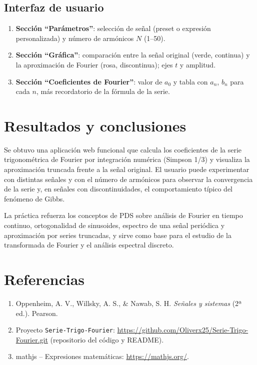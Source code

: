 \documentclass[12pt,a4paper]{article}
\begin{document}
\subsection{Interfaz de usuario}

\begin{enumerate}
  \item \textbf{Sección ``Parámetros''}: selección de señal (preset o expresión personalizada) y número de armónicos \(N\) (1--50).
  \item \textbf{Sección ``Gráfica''}: comparación entre la señal original (verde, continua) y la aproximación de Fourier (rosa, discontinua); ejes \(t\) y amplitud.
  \item \textbf{Sección ``Coeficientes de Fourier''}: valor de \(a_0\) y tabla con \(a_n\), \(b_n\) para cada \(n\), más recordatorio de la fórmula de la serie.
\end{enumerate}

\section{Resultados y conclusiones}

Se obtuvo una aplicación web funcional que calcula los coeficientes de la serie trigonométrica de Fourier por integración numérica (Simpson 1/3) y visualiza la aproximación truncada frente a la señal original. El usuario puede experimentar con distintas señales y con el número de armónicos para observar la convergencia de la serie y, en señales con discontinuidades, el comportamiento típico del fenómeno de Gibbs.

La práctica refuerza los conceptos de PDS sobre análisis de Fourier en tiempo continuo, ortogonalidad de sinusoides, espectro de una señal periódica y aproximación por series truncadas, y sirve como base para el estudio de la transformada de Fourier y el análisis espectral discreto.

\section*{Referencias}

\begin{enumerate}
  \item Oppenheim, A. V., Willsky, A. S., \& Nawab, S. H. \emph{Señales y sistemas} (2ª ed.). Pearson.
  \item Proyecto \texttt{Serie-Trigo-Fourier}: \url{https://github.com/Oliverx25/Serie-Trigo-Fourier.git} (repositorio del código y README).
  \item mathjs -- Expresiones matemáticas: \url{https://mathjs.org/}.
\end{enumerate}
\end{document}
